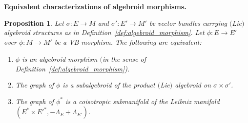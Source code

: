 \documentclass[10pt,a4paper]{amsart}
\newcommand{\und}{\underline}
\newcommand{\ra}{\rightarrow}
\numberwithin{equation}{section}
\newtheorem{prop}[thm]{Proposition}
\theoremstyle{definition}
\begin{document}
{\bf Equivalent characterizations of algebroid morphisms.}
\begin{prop}\label{prop:alg_morphism_eqv} Let $\sigma\colon E\ra M$ and $\sigma'\colon E'\ra M'$ be vector bundles carrying $($Lie$)$ algebroid structures as in Definition~{\rm \ref{def:algebroid_morphism}}. Let
 $\phi\colon E\ra E'$ over $\und{\phi}\colon M\ra M'$ be a VB morphism. The following are equivalent:
\begin{enumerate}[$(i)$]\itemsep=0pt
\item \label{cond:alg_morph_Mac} $\phi$ is an algebroid morphism $($in the sense of Definition~{\rm \ref{def:algebroid_morphism})}.
\item \label{cond:alg_morph_graph} The graph of $\phi$ is a subalgebroid of the product $($Lie$)$ algebroid on $\sigma\times \sigma'$.
\item \label{cond:alg_morph_Leibniz} The graph of $\phi^\ast$ is a coisotropic submanifold of the Leibniz manifold~{\rm \cite{JG_PU_Algebroids_1999}} $(E^\ast\times {E'}^\ast, -\Lambda_E + \Lambda_{E'})$.
\end{enumerate}
\end{prop}
\end{document}
